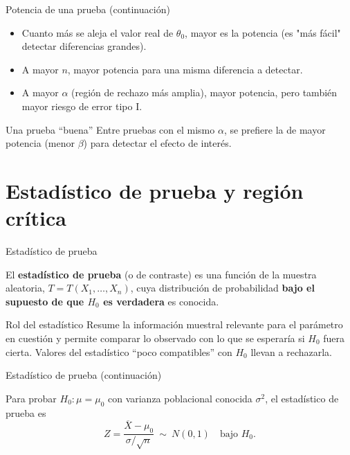 \documentclass[aspectratio=169,11pt]{beamer}
\begin{document}
\begin{frame}{Potencia de una prueba (continuación)}
\begin{itemize}
\item Cuanto más se aleja el valor real de $\theta_0$, mayor es la potencia (es "más fácil" detectar diferencias grandes).
\item A mayor $n$, mayor potencia para una misma diferencia a detectar.
\item A mayor $\alpha$ (región de rechazo más amplia), mayor potencia, pero también mayor riesgo de error tipo I.
\end{itemize}

\begin{alertblock}{Una prueba ``buena''}
Entre pruebas con el mismo $\alpha$, se prefiere la de mayor potencia (menor $\beta$) para detectar el efecto de interés.
\end{alertblock}
\end{frame}

\section{Estadístico de prueba y región crítica}

\begin{frame}{Estadístico de prueba}
\begin{definition}
El \textbf{estadístico de prueba} (o de contraste) es una función de la muestra aleatoria, $T=T(X_1,\dots,X_n)$, cuya distribución de probabilidad \textbf{bajo el supuesto de que $H_0$ es verdadera} es conocida.
\end{definition}

\begin{block}{Rol del estadístico}
Resume la información muestral relevante para el parámetro en cuestión y permite comparar lo observado con lo que se esperaría si $H_0$ fuera cierta. Valores del estadístico ``poco compatibles'' con $H_0$ llevan a rechazarla.
\end{block}

\end{frame}

\begin{frame}{Estadístico de prueba (continuación)}
\begin{example}
Para probar $H_0:\mu=\mu_0$ con varianza poblacional conocida $\sigma^2$, el estadístico de prueba es
\[
Z = \frac{\overline{X}-\mu_0}{\sigma/\sqrt{n}} \ \sim\ N(0,1) \quad \text{bajo } H_0.
\]
\end{example}
\end{frame}
\end{document}

